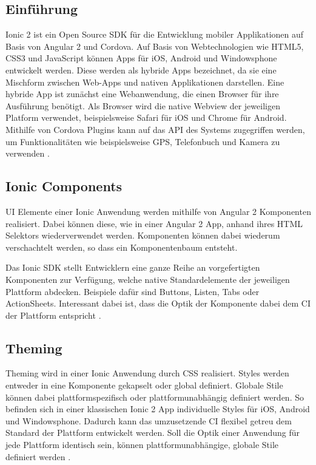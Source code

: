 \subsection{Einführung}

Ionic 2 ist ein Open Source \ac{SDK} für die Entwicklung mobiler Applikationen auf Basis von Angular 2 und Cordova.
Auf Basis von Webtechnologien wie HTML5, CSS3 und JavaScript können Apps für iOS, Android und Windowsphone
entwickelt werden. Diese werden als hybride Apps bezeichnet,
da sie eine Mischform zwischen Web-Apps und nativen Applikationen darstellen.
Eine hybride App ist zunächst eine Webanwendung, die einen Browser für ihre Ausführung benötigt.
Als Browser wird die native Webview der jeweiligen Platform verwendet,
beispielsweise Safari für iOS und Chrome für Android.
Mithilfe von Cordova Plugins kann auf das \ac{API} des Systems zugegriffen werden,
um Funktionalitäten wie beispielsweise GPS, Telefonbuch und Kamera zu verwenden \cite{ionic34:online}.

\subsection{Ionic Components}

\ac{UI} Elemente einer Ionic Anwendung werden mithilfe von Angular 2 Komponenten realisiert.
Dabei können diese, wie in einer Angular 2 App, anhand ihres HTML Selektors wiederverwendet werden.
Komponenten können dabei wiederum verschachtelt werden, so dass ein Komponentenbaum entsteht.

Das Ionic \ac{SDK} stellt Entwicklern eine ganze Reihe an vorgefertigten Komponenten zur Verfügung,
welche native Standardelemente der jeweiligen Plattform abdecken. Beispiele dafür sind Buttons, Listen, Tabs oder ActionSheets.
Interessant dabei ist, dass die Optik der Komponente dabei dem \ac{CI} der Plattform entspricht \cite{ionic99:online}.

\subsection{Theming}
Theming wird in einer Ionic Anwendung durch \ac{CSS} realisiert.
Styles werden entweder in eine Komponente gekapselt oder global definiert.
Globale Stile können dabei plattformspezifisch oder plattformunabhängig definiert werden.
So befinden sich in einer klassischen Ionic 2 App individuelle Styles für iOS, Android und Windowsphone.
Dadurch kann das umzusetzende \ac{CI} flexibel getreu dem Standard der Plattform entwickelt werden.
Soll die Optik einer Anwendung für jede Plattform identisch sein,
können plattformunabhängige, globale Stile definiert werden \cite{ionic73:online}.


